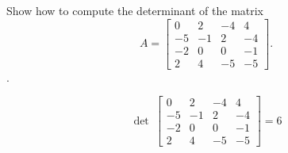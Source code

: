
\begin{exerciseStatement}


Show how to compute the determinant of the matrix \[A= \left[\begin{array}{cccc}
0 & 2 & -4 & 4 \\
-5 & -1 & 2 & -4 \\
-2 & 0 & 0 & -1 \\
2 & 4 & -5 & -5
\end{array}\right] .\].


\end{exerciseStatement}
    
\begin{exerciseAnswer} 
\[\operatorname{det}\  \left[\begin{array}{cccc}
0 & 2 & -4 & 4 \\
-5 & -1 & 2 & -4 \\
-2 & 0 & 0 & -1 \\
2 & 4 & -5 & -5
\end{array}\right] = 6 \]
\end{exerciseAnswer}
    
